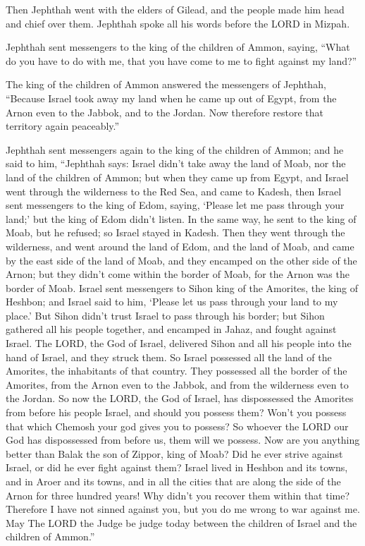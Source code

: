 Then Jephthah went with the elders of Gilead, and the
people made him head and chief over them. Jephthah spoke all his words
before the LORD in Mizpah.

 Jephthah sent messengers to the king of the children of
Ammon, saying, ``What do you have to do with me, that you have come to
me to fight against my land?''

 The king of the children of Ammon answered the
messengers of Jephthah, ``Because Israel took away my land when he came
up out of Egypt, from the Arnon even to the Jabbok, and to the Jordan.
Now therefore restore that territory again peaceably.''

 Jephthah sent messengers again to the king of the
children of Ammon;  and he said to him, ``Jephthah says:
Israel didn't take away the land of Moab, nor the land of the children
of Ammon;  but when they came up from Egypt, and Israel
went through the wilderness to the Red Sea, and came to Kadesh,
 then Israel sent messengers to the king of Edom, saying,
`Please let me pass through your land;' but the king of Edom didn't
listen. In the same way, he sent to the king of Moab, but he refused; so
Israel stayed in Kadesh.  Then they went through the
wilderness, and went around the land of Edom, and the land of Moab, and
came by the east side of the land of Moab, and they encamped on the
other side of the Arnon; but they didn't come within the border of Moab,
for the Arnon was the border of Moab.  Israel sent
messengers to Sihon king of the Amorites, the king of Heshbon; and
Israel said to him, `Please let us pass through your land to my place.'
 But Sihon didn't trust Israel to pass through his
border; but Sihon gathered all his people together, and encamped in
Jahaz, and fought against Israel.  The LORD, the God of
Israel, delivered Sihon and all his people into the hand of Israel, and
they struck them. So Israel possessed all the land of the Amorites, the
inhabitants of that country.  They possessed all the
border of the Amorites, from the Arnon even to the Jabbok, and from the
wilderness even to the Jordan.  So now the LORD, the God
of Israel, has dispossessed the Amorites from before his people Israel,
and should you possess them?  Won't you possess that
which Chemosh your god gives you to possess? So whoever the LORD our God
has dispossessed from before us, them will we possess. 
Now are you anything better than Balak the son of Zippor, king of Moab?
Did he ever strive against Israel, or did he ever fight against them?
 Israel lived in Heshbon and its towns, and in Aroer and
its towns, and in all the cities that are along the side of the Arnon
for three hundred years! Why didn't you recover them within that time?
 Therefore I have not sinned against you, but you do me
wrong to war against me. May The LORD the Judge be judge today between
the children of Israel and the children of Ammon.''

